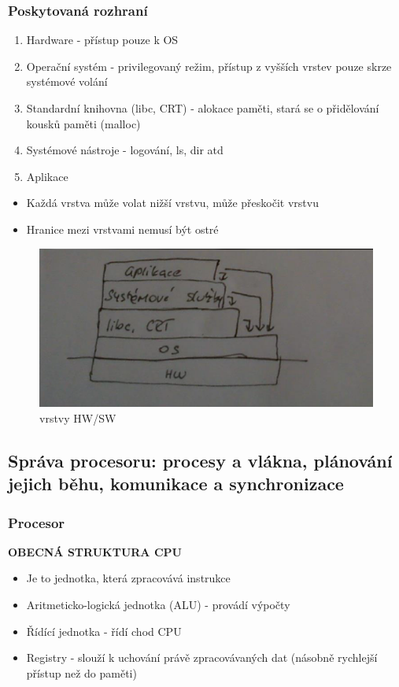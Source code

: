 \documentclass[10pt,a4paper]{article}
\begin{document}
\subsubsection{Poskytovaná rozhraní}
\begin{enumerate}
	\item Hardware - přístup pouze k OS
	\item Operační systém - privilegovaný režim, přístup z vyšších vrstev pouze skrze systémové volání
	\item Standardní knihovna (libc, CRT) - alokace paměti, stará se o přidělování kousků paměti (malloc)
	\item Systémové nástroje - logování, ls, dir atd
	\item Aplikace
\end{enumerate}
\begin{itemize}
	\item Každá vrstva může volat nižší vrstvu, může přeskočit vrstvu
	\item Hranice mezi vrstvami nemusí být ostré
\end{itemize}

\begin{figure} [h]
		\includegraphics[scale=1]{img/vrstvy_HW-SW.png}
		\caption{vrstvy HW/SW}
\end{figure}

\subsection{Správa procesoru: procesy a vlákna, plánování jejich běhu, komunikace a synchronizace}

\subsubsection{Procesor}
\textbf{OBECNÁ STRUKTURA CPU}
\begin{itemize}
	\item Je to jednotka, která zpracovává instrukce
	\item Aritmeticko-logická jednotka (ALU) - provádí výpočty
	\item Řídící jednotka - řídí chod CPU
	\item Registry - slouží k uchování právě zpracovávaných dat (násobně rychlejší přístup než do paměti)
\end{itemize}
\end{document}
